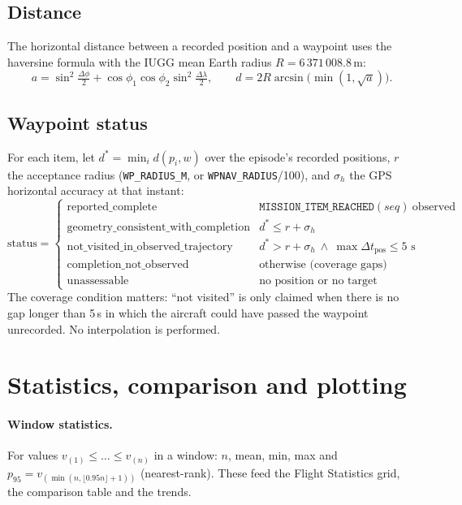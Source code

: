 \documentclass[11pt,a4paper]{article}
\newcommand{\code}[1]{\texttt{#1}}
\begin{document}
\subsection{Distance}
The horizontal distance between a recorded position and a waypoint uses the haversine formula with
the IUGG mean Earth radius $R=6\,371\,008.8$\,m:
\[
a=\sin^2\!\tfrac{\Delta\phi}{2}+\cos\phi_1\cos\phi_2\sin^2\!\tfrac{\Delta\lambda}{2},\qquad
d=2R\arcsin\!\bigl(\min(1,\sqrt a)\bigr).
\]

\subsection{Waypoint status}
For each item, let $d^\ast=\min_i d(p_i,w)$ over the episode's recorded positions, $r$ the acceptance
radius (\code{WP\_RADIUS\_M}, or \code{WPNAV\_RADIUS}/100), and $\sigma_h$ the GPS horizontal accuracy
at that instant:
\[
\text{status}=
\begin{cases}
\text{reported\_complete} & \code{MISSION\_ITEM\_REACHED}(seq)\ \text{observed}\\
\text{geometry\_consistent\_with\_completion} & d^\ast\le r+\sigma_h\\
\text{not\_visited\_in\_observed\_trajectory} & d^\ast> r+\sigma_h\ \wedge\ \max\Delta t_{\text{pos}}\le5\text{ s}\\
\text{completion\_not\_observed} & \text{otherwise (coverage gaps)}\\
\text{unassessable} & \text{no position or no target}
\end{cases}
\]
The coverage condition matters: ``not visited'' is only claimed when there is no gap longer than
5\,s in which the aircraft could have passed the waypoint unrecorded. No interpolation is performed.

\section{Statistics, comparison and plotting}

\paragraph{Window statistics.} For values $v_{(1)}\le\dots\le v_{(n)}$ in a window: $n$, mean, min,
max and $p_{95}=v_{(\min(n,\lfloor0.95n\rfloor+1))}$ (nearest-rank). These feed the Flight Statistics
grid, the comparison table and the trends.
\end{document}
